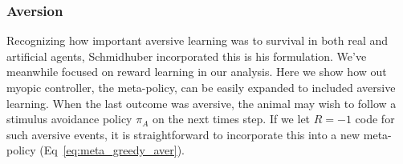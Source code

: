 \documentclass[9pt,twocolumn,twoside]{pnas-new}
\begin{document}



\subsubsection*{Aversion}
Recognizing how important aversive learning was to survival in both real and artificial agents, Schmidhuber \cite{Schmidhuber1991} incorporated this is his formulation. We've meanwhile focused on reward learning in our analysis. Here we show how out myopic controller, the meta-policy, can be easily expanded to included aversive learning. When the last outcome was aversive, the animal may wish to follow a stimulus avoidance policy $\pi_A$ on the next times step. If we let $R = -1$ code for such aversive events, it is straightforward to incorporate this into a new meta-policy (Eq~\ref{eq:meta_greedy_aver}).
\end{document}
